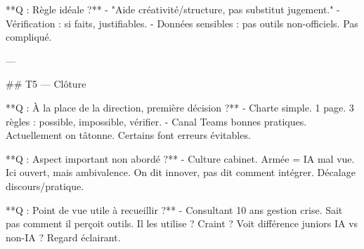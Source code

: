 **Q : Règle idéale ?**
- "Aide créativité/structure, pas substitut jugement."
- Vérification : si faits, justifiables.
- Données sensibles : pas outils non-officiels. Pas compliqué.

---

## T5 — Clôture

**Q : À la place de la direction, première décision ?**
- Charte simple. 1 page. 3 règles : possible, impossible, vérifier.
- Canal Teams bonnes pratiques. Actuellement on tâtonne. Certains font erreurs évitables.

**Q : Aspect important non abordé ?**
- Culture cabinet. Armée = IA mal vue. Ici ouvert, mais ambivalence. On dit innover, pas dit comment intégrer. Décalage discours/pratique.

**Q : Point de vue utile à recueillir ?**
- Consultant 10 ans gestion crise. Sait pas comment il perçoit outils. Il les utilise ? Craint ? Voit différence juniors IA vs non-IA ? Regard éclairant.